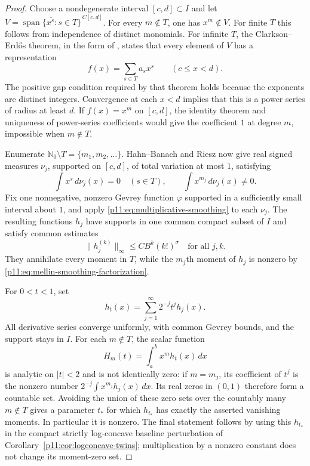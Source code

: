 \documentclass[11pt,letterpaper]{article}
\theoremstyle{definition}
\theoremstyle{remark}
\newcommand{\1}{\mathbf 1}
\begin{document}
\begin{proof}
Choose a nondegenerate interval $[c,d]\subset I$ and let
$V=\overline{\operatorname{span}\{x^s:s\in T\}}^{\,C[c,d]}$.
For every $m\notin T$, one has $x^m\notin V$. For finite $T$ this follows
from independence of distinct monomials. For infinite $T$, the
Clarkson--Erd\H{o}s theorem, in the form of
\cite[Theorem~3.1]{BorweinErdelyi1995}, states that every element of $V$
has a representation
\[
 f(x)=\sum_{s\in T}a_sx^s\qquad(c\leq x<d).
\]
The positive gap condition required by that theorem holds because the
exponents are distinct integers. Convergence at each $x<d$ implies that
this is a power series of radius at least $d$. If $f(x)=x^m$ on
$[c,d]$, the identity theorem and uniqueness of power-series coefficients
would give the coefficient $1$ at degree $m$, impossible when $m\notin T$.

Enumerate $\mathbb N_0\setminus T=\{m_1,m_2,\ldots\}$.
Hahn--Banach and Riesz now give real signed measures $\nu_j$, supported
on $[c,d]$, of total variation at most $1$, satisfying
\[
 \int x^s\,d\nu_j(x)=0\quad(s\in T),
 \qquad \int x^{m_j}\,d\nu_j(x)\ne0.
\]
Fix one nonnegative, nonzero Gevrey function $\varphi$ supported in a
sufficiently small interval about $1$, and apply
\eqref{p11:eq:multiplicative-smoothing} to each $\nu_j$. The resulting
functions $h_j$ have supports in one common compact subset of $I$ and
satisfy common estimates
\[
 \|h_j^{(k)}\|_\infty\leq C B^k(k!)^\sigma
 \quad\text{for all }j,k.
\]
They annihilate every moment in $T$, while the $m_j$th moment of $h_j$
is nonzero by \eqref{p11:eq:mellin-smoothing-factorization}.

For $0<t<1$, set
\[
 h_t(x)=\sum_{j=1}^\infty 2^{-j}t^j h_j(x).
\]
All derivative series converge uniformly, with common Gevrey bounds,
and the support stays in $I$. For each $m\notin T$, the scalar function
\[
 H_m(t)=\int_a^b x^m h_t(x)\,dx
\]
is analytic on $|t|<2$ and is not identically zero: if $m=m_j$, its
coefficient of $t^j$ is the nonzero number
$2^{-j}\int x^{m_j}h_j(x)\,dx$. Its real zeros in $(0,1)$ therefore
form a countable set. Avoiding the union of these zero sets over the
countably many $m\notin T$ gives a parameter $t_*$ for which $h_{t_*}$
has exactly the asserted vanishing moments. In particular it is nonzero.
The final statement follows by using this $h_{t_*}$ in the compact
strictly log-concave baseline perturbation of
Corollary~\ref{p11:cor:logconcave-twins}; multiplication by a nonzero constant
does not change its moment-zero set.
\end{proof}
\end{document}
